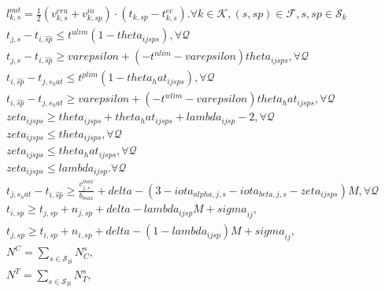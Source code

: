 \begin{align}
  & l_{k , s}^{o u t} = \frac{1}{2} \left(v_{k , s}^{c r u} + v_{k , sp}^{i n}\right) \cdot \left(t_{k , sp} - t_{k , s}^{e c}\right) . \forall k \in \mathcal{K} , \left(s , sp\right) \in \mathcal{F} , s , sp \in \mathcal{S}_{k} \tag{eq\_0036} \\
  & t_{j , s} - t_{i , \hat{sp}} \leq t^{u l i m} \left(1 - {\mathit{theta}}_{i j sp s}\right) , \forall \mathcal{Q} \tag{eq\_0039} \\
  & t_{j , s} - t_{i , \hat{sp}} \geq \mathit{varepsilon} + \left(- t^{n l i m} - \mathit{varepsilon}\right) {\mathit{theta}}_{i j sp s} , \forall \mathcal{Q} \tag{eq\_0041} \\
  & t_{i , \hat{sp}} - t_{j , s_hat} \leq t^{p l i m} \left(1 - theta_hat_{i j sp s}\right) , \forall \mathcal{Q} \tag{eq\_0042} \\
  & t_{i , \hat{sp}} - t_{j , s_hat} \geq \mathit{varepsilon} + \left(- t^{w l i m} - \mathit{varepsilon}\right) theta_hat_{i j sp s} , \forall \mathcal{Q} \tag{eq\_0043} \\
  & \mathit{zeta}_{i j sp s} \geq {\mathit{theta}}_{i j sp s} + theta_hat_{i j sp s} + \mathit{lambda}_{i j sp} - 2 , \forall \mathcal{Q} \tag{eq\_0044} \\
  & \mathit{zeta}_{i j sp s} \leq {\mathit{theta}}_{i j sp s} , \forall \mathcal{Q} \tag{eq\_0045} \\
  & \mathit{zeta}_{i j sp s} \leq theta_hat_{i j sp s} , \forall \mathcal{Q} \tag{eq\_0046} \\
  & \mathit{zeta}_{i j sp s} \leq \mathit{lambda}_{i j sp} . \forall \mathcal{Q} \tag{eq\_0047} \\
  & t_{j , s_hat} - t_{i , \hat{sp}} \geq \frac{v_{j , s}^{m a x}}{b_{m a x}} + \mathit{delta} - \left(3 - \mathit{iota}_{\mathit{alpha} , j , s} - \mathit{iota}_{\mathit{beta} , j , s} - \mathit{zeta}_{i j sp s}\right) M , \forall \mathcal{Q} \tag{eq\_0048} \\
  & t_{i , sp} \geq t_{j , sp} + n_{j , sp} + \mathit{delta} - \mathit{lambda}_{i j sp} M + \mathit{sigma}_{i j} , \tag{eq\_0058} \\
  & t_{j , sp} \geq t_{i , sp} + n_{i , sp} + \mathit{delta} - \left(1 - \mathit{lambda}_{i j sp}\right) M + \mathit{sigma}_{i j} , \tag{eq\_0060} \\
  & N^{C} = \sum_{s \in \mathcal{S}_{B}} N_{C}^{s} , \tag{eq\_0061} \\
  & N^{T} = \sum_{s \in \mathcal{S}_{B}} N_{T}^{s} , \tag{eq\_0062} \\
\end{align}
